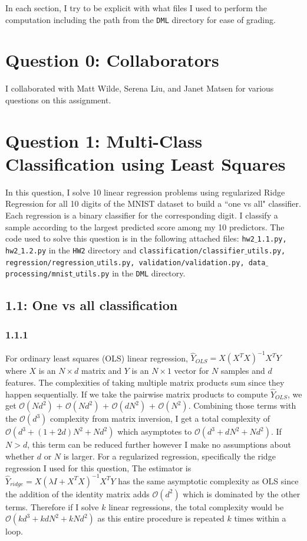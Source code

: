 \documentclass[12pt]{amsart}
\begin{document}
In each section, I try to be explicit with what files I used to perform the computation including the path from the {\tt DML} directory for ease of grading.

\section*{Question 0: Collaborators}
I collaborated with Matt Wilde, Serena Liu, and Janet Matsen for various questions on this assignment.


\section*{Question 1: Multi-Class Classification using Least Squares}

In this question, I solve 10 linear regression problems using regularized Ridge Regression for all 10 digits of the MNIST dataset to build a ``one vs all" classifier.  Each regression is a binary classifier for the corresponding digit.  I classify a sample according to the largest predicted score among my 10 predictors.  The code used to solve this question is in the following attached files: {\tt hw2$\_$1.1.py, hw2$\_$1.2.py} in the {\tt HW2} directory and {\tt classification/classifier$\_$utils.py, regression/regression$\_$utils.py, validation/validation.py, data$\_$processing/mnist$\_$utils.py} in the {\tt DML} directory.

\subsection*{1.1: One vs all classification}

\subsubsection*{1.1.1}

For ordinary least squares (OLS) linear regression, $\hat{Y}_{OLS} = X(X^T X)^{-1}X^T Y$ where $X$ is an $N \times d$ matrix and $Y$ is an $N \times 1$ vector for $N$ samples and $d$ features.  The complexities of taking multiple matrix products sum since they happen sequentially.  If we take the pairwise matrix products to compute $\hat{Y}_{OLS}$, we get $\mathcal{O}(Nd^2)$ + $\mathcal{O}(Nd^2)$ + $\mathcal{O}(dN^2)$ + $\mathcal{O}(N^2)$.  Combining those terms with the $\mathcal{O}(d^3)$ complexity from matrix inversion, I get a total complexity of $\mathcal{O}(d^3 + (1+2d)N^2 + Nd^2)$ which asymptotes to $\mathcal{O}(d^3 + dN^2 + Nd^2)$.  If $N > d$, this term can be reduced further however I make no assumptions about whether $d$ or $N$ is larger.  For a regularized regression, specifically the ridge regression I used for this question, The estimator is $\hat{Y}_{ridge} = X(\lambda I + X^T X)^{-1}X^T Y$ has the same asymptotic complexity as OLS since the addition of the identity matrix adds $\mathcal{O}(d^2)$ which is dominated by the other terms.  Therefore if I solve $k$ linear regressions, the total complexity would be $\mathcal{O}(kd^3 + kdN^2 + kNd^2)$ as this entire procedure is repeated $k$ times within a loop.
\end{document}

